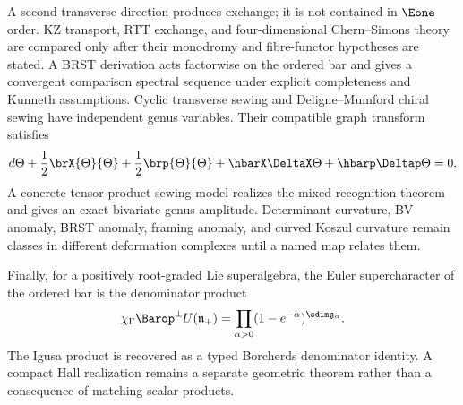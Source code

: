 A second transverse direction produces exchange; it is not contained in \(\Eone\) order.  KZ transport, RTT exchange, and four-dimensional Chern--Simons theory are compared only after their monodromy and fibre-functor hypotheses are stated.  A BRST derivation acts factorwise on the ordered bar and gives a convergent comparison spectral sequence under explicit completeness and Kunneth assumptions.  Cyclic transverse sewing and Deligne--Mumford chiral sewing have independent genus variables.  Their compatible graph transform satisfies
\[
 d\Theta+\frac12\brX{\Theta}{\Theta}+\frac12\brp{\Theta}{\Theta}
 +\hbarX\DeltaX\Theta+\hbarp\Deltap\Theta=0.
\]
A concrete tensor-product sewing model realizes the mixed recognition theorem and gives an exact bivariate genus amplitude.  Determinant curvature, BV anomaly, BRST anomaly, framing anomaly, and curved Koszul curvature remain classes in different deformation complexes until a named map relates them.

Finally, for a positively root-graded Lie superalgebra, the Euler supercharacter of the ordered bar is the denominator product
\[
 \chi_\Gamma\Barop^{\perp}U(\mathfrak n_+)
 =\prod_{\alpha>0}(1-e^{-\alpha})^{\sdim\mathfrak g_\alpha}.
\]
The Igusa product is recovered as a typed Borcherds denominator identity.  A compact Hall realization remains a separate geometric theorem rather than a consequence of matching scalar products.


